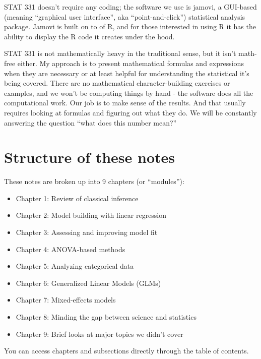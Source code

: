\documentclass[
  letterpaper,
  DIV=11,
  numbers=noendperiod]{scrreprt}
\providecommand{\tightlist}{%
  \setlength{\itemsep}{0pt}\setlength{\parskip}{0pt}}\usepackage{longtable,booktabs,array}
\begin{document}
STAT 331 doesn't require any coding; the software we use is jamovi, a
GUI-based (meaning ``graphical user interface'', aka
``point-and-click'') statistical analysis package. Jamovi is built on to
of R, and for those interested in using R it has the ability to display
the R code it creates under the hood.

STAT 331 is not mathematically heavy in the traditional sense, but it
isn't math-free either. My approach is to present mathematical formulas
and expressions when they are necessary or at least helpful for
understanding the statistical it's being covered. There are no
mathematical character-building exercises or examples, and we won't be
computing things by hand - the software does all the computational work.
Our job is to make sense of the results. And that usually requires
looking at formulas and figuring out what they do. We will be constantly
answering the question ``what does this number mean?''

\hypertarget{structure-of-these-notes}{%
\section*{Structure of these notes}\label{structure-of-these-notes}}


These notes are broken up into 9 chapters (or ``modules''):

\begin{itemize}
\tightlist
\item
  Chapter 1: Review of classical inference
\item
  Chapter 2: Model building with linear regression
\item
  Chapter 3: Assessing and improving model fit
\item
  Chapter 4: ANOVA-based methods
\item
  Chapter 5: Analyzing categorical data
\item
  Chapter 6: Generalized Linear Models (GLMs)
\item
  Chapter 7: Mixed-effects models
\item
  Chapter 8: Minding the gap between science and statistics
\item
  Chapter 9: Brief looks at major topics we didn't cover
\end{itemize}

You can access chapters and subsections directly through the table of
contents.
\end{document}
